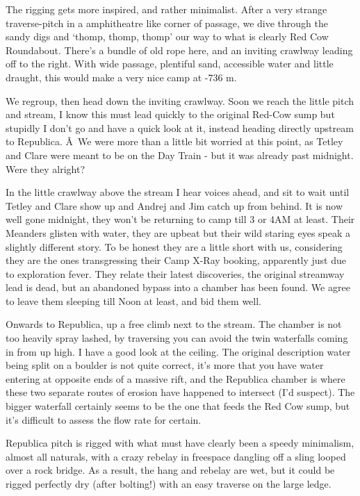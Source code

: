 The rigging gets more inspired, and rather minimalist. After a very
strange traverse-pitch in a amphitheatre like corner of passage, we dive
through the sandy digs and `thomp, thomp, thomp' our way to what is
clearly Red Cow Roundabout. There's a bundle of old rope here, and an
inviting crawlway leading off to the right. With wide passage, plentiful
sand, accessible water and little draught, this would make a very nice
camp at -736 m.

We regroup, then head down the inviting crawlway. Soon we reach the
little pitch and stream, I know this must lead quickly to the original
Red-Cow sump but stupidly I don't go and have a quick look at it,
instead heading directly upstream to Republica. Â~We were more than a
little bit worried at this point, as Tetley and Clare were meant to be
on the Day Train - but it was already past midnight. Were they alright?

In the little crawlway above the stream I hear voices ahead, and sit to
wait until Tetley and Clare show up and Andrej and Jim catch up from
behind. It is now well gone midnight, they won't be returning to camp
till 3 or 4AM at least. Their Meanders glisten with water, they are
upbeat but their wild staring eyes speak a slightly different story. To
be honest they are a little short with us, considering they are the ones
transgressing their Camp X-Ray booking, apparently just due to
exploration fever. They relate their latest discoveries, the original
streamway lead is dead, but an abandoned bypass into a chamber has been
found. We agree to leave them sleeping till Noon at least, and bid them
well.

Onwards to Republica, up a free climb next to the stream. The chamber is
not too heavily spray lashed, by traversing you can avoid the twin
waterfalls coming in from up high. I have a good look at the ceiling.
The original description water being split on a boulder is not quite
correct, it's more that you have water entering at opposite ends of a
massive rift, and the Republica chamber is where these two separate
routes of erosion have happened to intersect (I'd suspect). The bigger
waterfall certainly seems to be the one that feeds the Red Cow sump, but
it's difficult to assess the flow rate for certain.

Republica pitch is rigged with what must have clearly been a speedy
minimalism, almost all naturals, with a crazy rebelay in freespace
dangling off a sling looped over a rock bridge. As a result, the hang
and rebelay are wet, but it could be rigged perfectly dry (after
bolting!) with an easy traverse on the large ledge.

